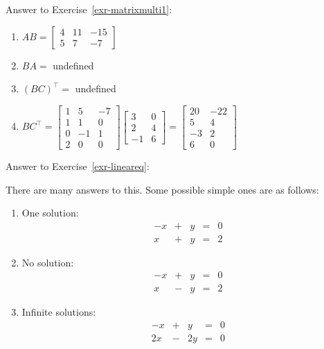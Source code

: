 \documentclass[
  letterpaper,
]{book}
\theoremstyle{definition}
\theoremstyle{definition}
\theoremstyle{plain}
\theoremstyle{definition}
\theoremstyle{plain}
\theoremstyle{plain}
\theoremstyle{remark}
\begin{document}
Answer to Exercise~\ref{exr-matrixmulti1}:

\begin{enumerate}
\def\labelenumi{\arabic{enumi}.}
\item
  \(AB = \begin{bmatrix} 4 & 11 & -15 \\ 5 & 7 & -7 \end{bmatrix}\)
\item
  \(BA =\) undefined
\item
  \((BC)^\top =\) undefined
\item
  \(BC^\top = \begin{bmatrix} 1&5&-7\\1&1&0\\0&-1&1\\2&0&0\end{bmatrix}\begin{bmatrix} 3&0\\2&4\\-1&6 \end{bmatrix} =\begin{bmatrix}20 & -22 \\ 5 & 4 \\ -3 &2 \\6 & 0\end{bmatrix}\)
\end{enumerate}

Answer to Exercise~\ref{exr-lineareq}:

There are many answers to this. Some possible simple ones are as
follows:

\begin{enumerate}
\def\labelenumi{\arabic{enumi}.}
\item
  One solution: \[\begin{matrix}
           -x  & + & y & = & 0\\
           x & + &  y & = &  2
           \end{matrix}\]
\item
  No solution: \[\begin{matrix}
           -x  & + & y & = & 0\\
           x & - &  y & = &  2
           \end{matrix}\]
\item
  Infinite solutions: \[\begin{matrix}
           -x  & + & y & = & 0\\
           2x & - &  2y & = &  0
           \end{matrix}\]
\end{enumerate}
\end{document}

